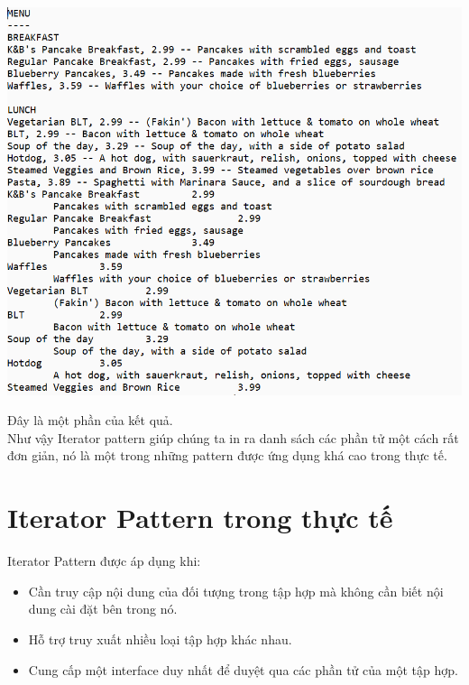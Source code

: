 \begin{center}
	\includegraphics[width=1\columnwidth,height=0.8\textheight]{GALLEYS/images/chapter3/images14}\\
\end{center}
Đây là một phần của kết quả.\\
Như vậy Iterator pattern giúp chúng ta in ra danh sách các phần tử một cách rất đơn giản, nó là một trong những pattern được ứng dụng khá cao trong thực tế.

\section{Iterator Pattern trong thực tế}
Iterator Pattern được áp dụng khi:

\begin{itemize}
	\item Cần truy cập nội dung của đối tượng trong tập hợp mà không cần biết nội dung cài đặt bên trong nó.\\
	\item Hỗ trợ truy xuất nhiều loại tập hợp khác nhau.\\
	\item Cung cấp một interface duy nhất để duyệt qua các phần tử của một tập hợp.\\
\end{itemize}